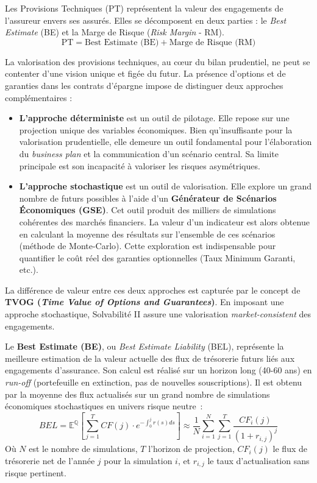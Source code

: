 Les Provisions Techniques (PT) représentent la valeur des engagements de l'assureur envers ses assurés. Elles se décomposent en deux parties : le \textit{Best Estimate} (BE) et la Marge de Risque (\textit{Risk Margin} - RM).
\begin{equation}
    \text{PT} = \text{Best Estimate (BE)} + \text{Marge de Risque (RM)}
\end{equation}
\bigskip


La valorisation des provisions techniques, au cœur du bilan prudentiel, ne peut se contenter d'une vision unique et figée du futur. La présence d'options et de garanties dans les contrats d'épargne impose de distinguer deux approches complémentaires :
\begin{itemize}
    \item \textbf{L'approche déterministe} est un outil de pilotage. Elle repose sur une projection unique des variables économiques. Bien qu'insuffisante pour la valorisation prudentielle, elle demeure un outil fondamental pour l'élaboration du \textit{business plan} et la communication d'un scénario central. Sa limite principale est son incapacité à valoriser les risques asymétriques.

    \item \textbf{L'approche stochastique} est un outil de valorisation. Elle explore un grand nombre de futurs possibles à l'aide d'un \textbf{Générateur de Scénarios Économiques (GSE)}. Cet outil produit des milliers de simulations cohérentes des marchés financiers. La valeur d'un indicateur est alors obtenue en calculant la moyenne des résultats sur l'ensemble de ces scénarios (méthode de Monte-Carlo). Cette exploration est indispensable pour quantifier le coût réel des garanties optionnelles (Taux Minimum Garanti, etc.).
\end{itemize}
La différence de valeur entre ces deux approches est capturée par le concept de \textbf{TVOG (\textit{Time Value of Options and Guarantees})}. En imposant une approche stochastique, Solvabilité II assure une valorisation \textit{market-consistent} des engagements.
\bigskip


Le \textbf{Best Estimate (BE)}, ou \textit{Best Estimate Liability} (BEL), représente la meilleure estimation de la valeur actuelle des flux de trésorerie futurs liés aux engagements d'assurance. Son calcul est réalisé sur un horizon long (40-60 ans) en \textit{run-off} (portefeuille en extinction, pas de nouvelles souscriptions). Il est obtenu par la moyenne des flux actualisés sur un grand nombre de simulations économiques stochastiques en univers risque neutre~:
\begin{equation}
    BEL = \mathbb{E}^{\mathbb{Q}} \left[ \sum_{j=1}^{T} CF(j) \cdot e^{-\int_0^j r(s)ds} \right] \approx \frac{1}{N}\sum_{i=1}^{N}\sum_{j=1}^{T}\frac{CF_{i}(j)}{(1+r_{i,j})^{j}}
\end{equation}
Où $N$ est le nombre de simulations, $T$ l'horizon de projection, $CF_{i}(j)$ le flux de trésorerie net de l'année $j$ pour la simulation $i$, et $r_{i,j}$ le taux d'actualisation sans risque pertinent.
\bigskip



